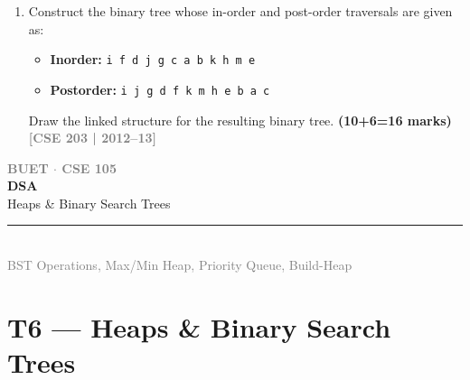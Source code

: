 \documentclass[12pt,a3paper]{article}
\newcommand{\yr}[1]{\hfill\textcolor{gray}{\small\textbf{[#1]}}}
\newcommand{\mk}[1]{\textcolor{orange!70!black}{\small\textbf{(#1 marks)}}}
\newcommand{\secdivider}[4]{%
  \newpage\thispagestyle{empty}%
  \vspace*{\fill}%
  \begin{tcolorbox}[enhanced,colback=#4!7,colframe=#3,boxrule=1.5pt,arc=8pt,
    left=20pt,right=20pt,top=22pt,bottom=22pt,
    shadow={3pt}{-3pt}{0pt}{black!15}]
    \centering
    {\large\textcolor{gray}{\textbf{BUET $\cdot$ CSE 105}}}\\[8pt]
    {\fontsize{26}{32}\selectfont\bfseries\textcolor{#3}{DSA}}\\[6pt]
    {\fontsize{15}{19}\selectfont\textcolor{dgray}{#1}}\\[12pt]
    \textcolor{#3!60}{\rule{0.5\textwidth}{0.5pt}}\\[6pt]
    {\small\textcolor{gray}{#2}}
  \end{tcolorbox}%
  \vspace*{\fill}\newpage%
}
\begin{document}
\begin{enumerate}
\item Construct the binary tree whose in-order and post-order traversals are given as:
\begin{itemize}
  \item \textbf{Inorder:} \texttt{i f d j g c a b k h m e}
  \item \textbf{Postorder:} \texttt{i j g d f k m h e b a c}
\end{itemize}
Draw the linked structure for the resulting binary tree. \mk{10+6=16}
\yr{CSE 203 | 2012--13}

\end{enumerate}
\newpage

\secdivider{Heaps \& Binary Search Trees}{BST Operations, Max/Min Heap, Priority Queue, Build-Heap}{cF}{cF}
\label{sec:T6}
\section{T6 --- Heaps \& Binary Search Trees}
\end{document}
